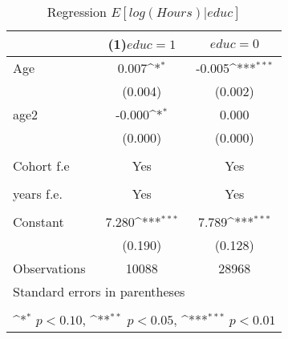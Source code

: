 \begin{table}[htbp]\centering
\def\sym#1{\ifmmode^{#1}\else\(^{#1}\)\fi}
\caption{Regression \(E[log(Hours)|educ]\) \label{Tab:reg3}}
\begin{tabular}{l*{2}{c}}
\toprule
                    &\multicolumn{1}{c}{(1)\(educ=1\)\label{Reg:3_h}}         &\multicolumn{1}{c}{\(educ=0\)\label{Reg:3_l}}         \\
\midrule
Age                 &       0.007\sym{*}  &      -0.005\sym{***}\\
                    &     (0.004)         &     (0.002)         \\
\addlinespace
age2                &      -0.000\sym{*}  &       0.000         \\
                    &     (0.000)         &     (0.000)         \\
\\
Cohort f.e           &       Yes        &      Yes \\
                            \\
\addlinespace
years f.e.            &       Yes         &       Yes         \\
                           \\
\addlinespace
Constant            &       7.280\sym{***}&       7.789\sym{***}\\
                    &     (0.190)         &     (0.128)         \\
\midrule
Observations        &       10088         &       28968         \\
\bottomrule
\multicolumn{3}{l}{\footnotesize Standard errors in parentheses}\\
\multicolumn{3}{l}{\footnotesize }\\
\multicolumn{3}{l}{\footnotesize \sym{*} \(p<0.10\), \sym{**} \(p<0.05\), \sym{***} \(p<0.01\)}\\
\end{tabular}
\end{table}
